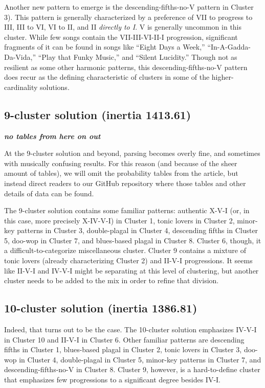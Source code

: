 Another new pattern to emerge is the descending-fifths-no-V pattern in Cluster 3). This pattern is generally characterized by a preference of VII to progress to III, III to VI, VI to II, and II \emph{directly to I}. V is generally uncommon in this cluster. While few songs contain the VII-III-VI-II-I progression, significant fragments of it can be found in songs like ``Eight Days a Week,'' ``In-A-Gadda-Da-Vida,'' ``Play that Funky Music,'' and ``Silent Lucidity.'' Though not as resilient as some other harmonic patterns, this descending-fifths-no-V pattern does recur as the defining characteristic of clusters in some of the higher-cardinality solutions.

\subsection{9-cluster solution (inertia 1413.61)}
\label{9-clustersolutioninertia1413.61}

\textbf{\emph{no tables from here on out}}

At the 9-cluster solution and beyond, parsing becomes overly fine, and sometimes with musically confusing results. For this reason (and because of the sheer amount of tables), we will omit the probability tables from the article, but instead direct readers to our GitHub repository where those tables and other details of data can be found.

The 9-cluster solution contains some familiar patterns: authentic X-V-I (or, in this case, more precisely X-IV-V-I) in Cluster 1, tonic lovers in Cluster 2, minor-key patterns in Cluster 3, double-plagal in Cluster 4, descending fifths in Cluster 5, doo-wop in Cluster 7, and blues-based plagal in Cluster 8. Cluster 6, though, it a difficult-to-categorize miscellaneous cluster. Cluster 9 contains a mixture of tonic lovers (already characterizing Cluster 2) and II-V-I progressions. It seems like II-V-I and IV-V-I might be separating at this level of clustering, but another cluster needs to be added to the mix in order to refine that division.

\subsection{10-cluster solution (inertia 1386.81)}
\label{10-clustersolutioninertia1386.81}

Indeed, that turns out to be the case. The 10-cluster solution emphasizes IV-V-I in Cluster 10 and II-V-I in Cluster 6. Other familiar patterns are descending fifths in Cluster 1, blues-based plagal in Cluster 2, tonic lovers in Cluster 3, doo-wop in Cluster 4, double-plagal in Cluster 5, minor-key patterns in Cluster 7, and descending-fifths-no-V in Cluster 8. Cluster 9, however, is a hard-to-define cluster that emphasizes few progressions to a significant degree besides IV-I.

